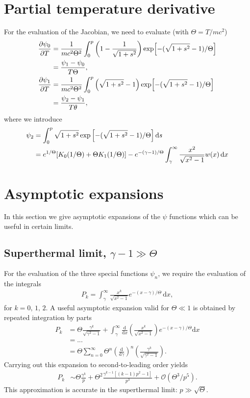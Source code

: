 \documentclass[11pt,a4paper]{article}
\newcommand{\rd}{\ensuremath{\mathrm{d}}}
\newcommand{\Ordo}{\ensuremath{\mathcal{O}}}%
\begin{document}
\section{Partial temperature derivative}
For the evaluation of the Jacobian, we need to evaluate (with $\Theta = T/mc^2$)
\begin{align}
\frac{\partial \psi_0}{\partial T} &= \frac{1}{mc^2\Theta^2}\int_0^p \left(1-\frac{1}{\sqrt{1+s^2}}\right) \exp\Bigl[-(\sqrt{1+s^2}-1)/\Theta\Bigr] \nonumber \\
&= \frac{\psi_1 - \psi_0}{T\Theta}, \\
\frac{\partial \psi_1}{\partial T} &= \frac{1}{mc^2\Theta^2}\int_0^p \left(\sqrt{1+s^2}-1\right) \exp\Bigl[-(\sqrt{1+s^2}-1)/\Theta\Bigr]  \nonumber \\
&= \frac{\psi_2 - \psi_1}{T\theta},
\end{align}
where we introduce 
\begin{align}
\psi_2 &= \int_0^p \sqrt{1+s^2} \exp{\Bigl[-(\sqrt{1+s^2}-1)/\Theta\Bigr]} \, \rd s \nonumber \\
&= e^{1/\Theta}[K_0(1/\Theta) + \Theta K_1(1/\Theta)] - e^{-(\gamma-1)/\Theta}\int_\gamma^\infty \frac{x^2}{\sqrt{x^2-1}}w(x)\,\rd x
\end{align}

\section{Asymptotic expansions}
In this section we give asymptotic expansions of the $\psi$ functions which can be useful in certain limits.

\subsection{Superthermal limit, $\gamma - 1 \gg \Theta$}

For the evaluation of the three special functions $\psi_n$, we require the evaluation of the integrals
\begin{align}
P_k = \int_{\gamma}^\infty \frac{x^k}{\sqrt{x^2-1}}e^{-(x-\gamma)/\Theta}\,\rd x,
\end{align}
for $k=0,\,1,\,2$. A useful asymptotic expansion valid for $\Theta \ll 1$ is obtained by repeated integration by parts
\begin{align}
P_k &= \Theta \frac{\gamma^k}{\sqrt{\gamma^2-1}} + \int_\gamma^\infty \frac{\rd}{\rd x}\left(\frac{x^k}{\sqrt{x^2-1}}\right)e^{-(x-\gamma)/\Theta} \rd x \nonumber \\
&= ... \nonumber \\
&= \Theta \sum_{n=0}^\infty \Theta^n  \left(\frac{\rd}{\rd \gamma}\right)^n\left(\frac{\gamma^k}{\sqrt{\gamma^2-1}}\right). 
\end{align}
Carrying out this expansion to second-to-leading order yields
\begin{align}
P_k &\sim \Theta \frac{\gamma^k}{p} + \Theta^2 \frac{\gamma^{k-1}[(k-1)p^2 - 1]}{p^3} + \Ordo(\Theta^3/p^5).
\end{align}
This approximation is accurate in the superthermal limit: $p \gg \sqrt{\Theta}$.
\end{document}
